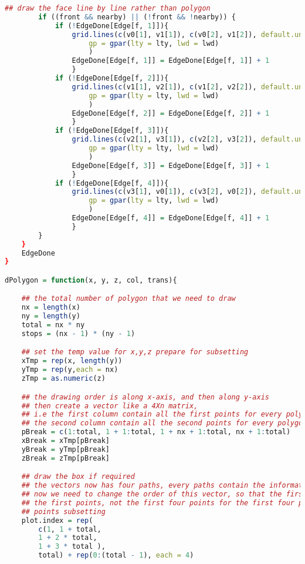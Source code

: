 \begin{lstlisting}[language = R]
        ## draw the face line by line rather than polygon
        if ((front && nearby) || (!front && !nearby)) {
            if (!EdgeDone[Edge[f, 1]]){
                grid.lines(c(v0[1], v1[1]), c(v0[2], v1[2]), default.units = 'native',
                    gp = gpar(lty = lty, lwd = lwd) 
                    )
                EdgeDone[Edge[f, 1]] = EdgeDone[Edge[f, 1]] + 1
                }
            if (!EdgeDone[Edge[f, 2]]){
                grid.lines(c(v1[1], v2[1]), c(v1[2], v2[2]), default.units = 'native',
                    gp = gpar(lty = lty, lwd = lwd) 
                    )
                EdgeDone[Edge[f, 2]] = EdgeDone[Edge[f, 2]] + 1
                }
            if (!EdgeDone[Edge[f, 3]]){
                grid.lines(c(v2[1], v3[1]), c(v2[2], v3[2]), default.units = 'native',
                    gp = gpar(lty = lty, lwd = lwd) 
                    )
                EdgeDone[Edge[f, 3]] = EdgeDone[Edge[f, 3]] + 1
                }
            if (!EdgeDone[Edge[f, 4]]){
                grid.lines(c(v3[1], v0[1]), c(v3[2], v0[2]), default.units = 'native',
                    gp = gpar(lty = lty, lwd = lwd)
                    )
                EdgeDone[Edge[f, 4]] = EdgeDone[Edge[f, 4]] + 1
                }
        }
    }
    EdgeDone
}

dPolygon = function(x, y, z, col, trans){

    ## the total number of polygon that we need to draw	
    nx = length(x)
    ny = length(y)
    total = nx * ny
    stops = (nx - 1) * (ny - 1)

    ## set the temp value for x,y,z prepare for subsetting
    xTmp = rep(x, length(y))
    yTmp = rep(y,each = nx)
    zTmp = as.numeric(z)

    ## the drawing order is along x-axis, and then along y-axis
    ## then create a vector like a 4Xn matrix, 
    ## i.e the first column contain all the first points for every polygons
    ## the second column contain all the second points for every polygons and so on 
    pBreak = c(1:total, 1 + 1:total, 1 + nx + 1:total, nx + 1:total)
    xBreak = xTmp[pBreak]
    yBreak = yTmp[pBreak]
    zBreak = zTmp[pBreak]

    ## draw the box if required
    ## the vectors now has four paths, every paths contain the information of every points of every polygon
    ## now we need to change the order of this vector, so that the first four index should be the order for drawing 
    ## the first points, not the first four points for the first four polygon
    ## points subsetting 
    plot.index = rep(
        c(1, 1 + total, 
        1 + 2 * total, 
        1 + 3 * total ),
        total) + rep(0:(total - 1), each = 4)


\end{lstlisting}
